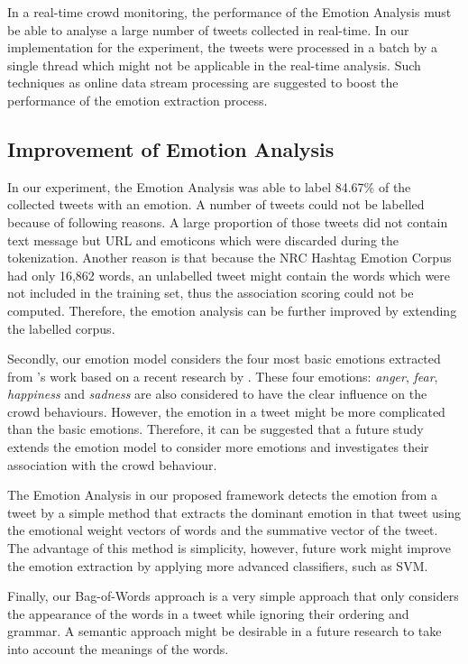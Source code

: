 In a real-time crowd monitoring, the performance of the Emotion Analysis must be able to analyse a large number of tweets collected in real-time. In our implementation for the experiment, the tweets were processed in a batch by a single thread which might not be applicable in the real-time analysis. Such techniques as online data stream processing are suggested to boost the performance of the emotion extraction process.

\subsection{Improvement of Emotion Analysis}
In our experiment, the Emotion Analysis was able to label 84.67\% of the collected tweets with an emotion. A number of tweets could not be labelled because of following reasons. A large proportion of those tweets did not contain text message but URL and emoticons which were discarded during the tokenization. Another reason is that because the NRC Hashtag Emotion Corpus had only 16,862 words, an unlabelled tweet might contain the words which were not included in the training set, thus the association scoring could not be computed. Therefore, the emotion analysis can be further improved by extending the labelled corpus.

Secondly, our emotion model considers the four most basic emotions extracted from \textcite{ekman1971constants}'s work based on a recent research by \textcite{Jack2014}. These four emotions: \textit{anger}, \textit{fear}, \textit{happiness} and \textit{sadness} are also considered to have the clear influence on the crowd behaviours. However, the emotion in a tweet might be more complicated than the basic emotions. Therefore, it can be suggested that a future study extends the emotion model to consider more emotions and investigates their association with the crowd behaviour.

The Emotion Analysis in our proposed framework detects the emotion from a tweet by a simple method that extracts the dominant emotion in that tweet using the emotional weight vectors of words and the summative vector of the tweet. The advantage of this method is simplicity, however, future work might improve the emotion extraction by applying more advanced classifiers, such as SVM.

Finally, our Bag-of-Words approach is a very simple approach that only considers the appearance of the words in a tweet while ignoring their ordering and grammar. A semantic approach might be desirable in a future research to take into account the meanings of the words.

